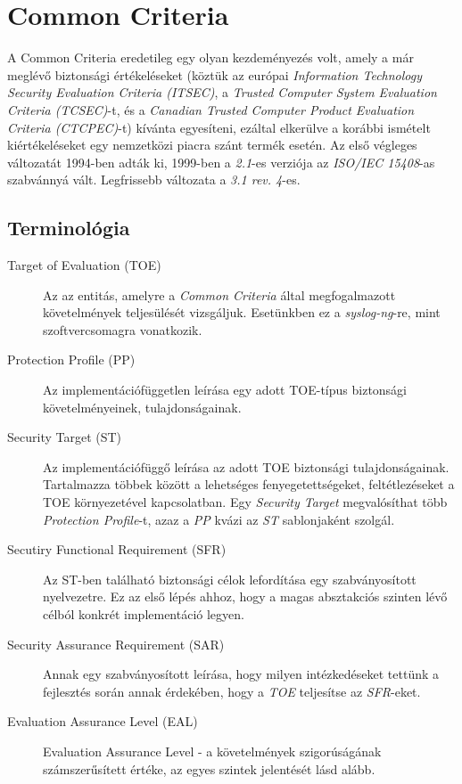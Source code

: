 \FloatBarrier

\section{Common Criteria}

A Common Criteria eredetileg egy olyan kezdeményezés volt, amely a már meglévő biztonsági
értékeléseket (köztük az európai \emph{Information Technology Security Evaluation Criteria (ITSEC)},
a \emph{Trusted Computer System Evaluation Criteria (TCSEC)}-t, és a
\emph{Canadian Trusted Computer Product Evaluation Criteria (CTCPEC)}-t) kívánta egyesíteni, ezáltal
elkerülve a korábbi ismételt kiértékeléseket egy nemzetközi piacra szánt termék esetén.  Az első
végleges változatát 1994-ben adták ki, 1999-ben a \emph{2.1}-es verziója az \emph{ISO/IEC 15408}-as
szabvánnyá vált. Legfrissebb változata a \emph{3.1 rev. 4}-es.

\subsection{Terminológia}

\begin{description}
    \item[Target of Evaluation (TOE)] {Az az entitás, amelyre a \emph{Common Criteria} által
        megfogalmazott követelmények teljesülését vizsgáljuk. Esetünkben ez a \emph{syslog-ng}-re,
        mint szoftvercsomagra vonatkozik.}
    \item[Protection Profile (PP)] { Az implementációfüggetlen leírása egy adott TOE-típus
        biztonsági követelményeinek, tulajdonságainak. }
    \item[Security Target (ST)] { Az implementációfüggő leírása az adott TOE biztonsági
        tulajdonságainak. Tartalmazza többek között a lehetséges fenyegetettségeket, feltétlezéseket
        a TOE környezetével kapcsolatban. Egy \emph{Security Target} megvalósíthat több
        \emph{Protection Profile}-t, azaz a \emph{PP} kvázi az \emph{ST} sablonjaként szolgál. }
    \item[Secutiry Functional Requirement (SFR)] { Az ST-ben található biztonsági célok lefordítása
        egy szabványosított nyelvezetre. Ez az első lépés ahhoz, hogy a magas absztakciós szinten
        lévő célból konkrét implementáció legyen. }
    \item[Security Assurance Requirement (SAR)] { Annak egy szabványosított leírása, hogy milyen
        intézkedéseket tettünk a fejlesztés során annak érdekében, hogy a \emph{TOE} teljesítse az
        \emph{SFR}-eket.}
    \item[Evaluation Assurance Level (EAL)]{Evaluation Assurance Level - a követelmények
        szigorúságának számszerűsített értéke, az egyes szintek jelentését lásd alább.}
\end{description}

